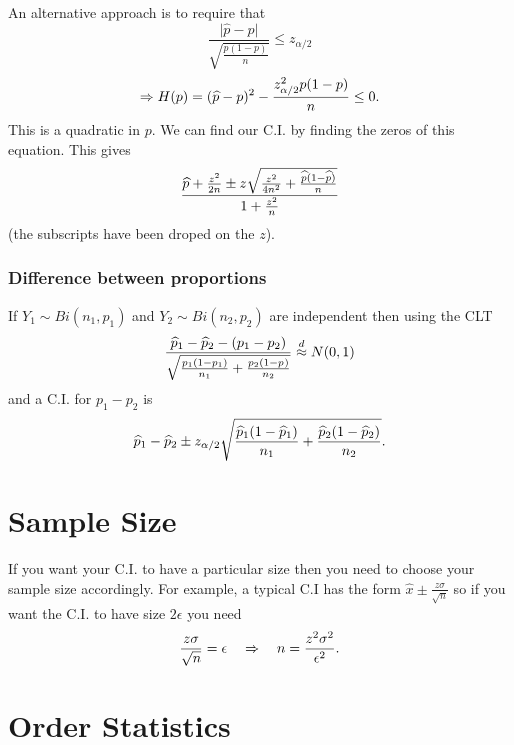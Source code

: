 \documentclass[10pt, two column]{article}
\begin{document}
An alternative approach is to require that \vspace{-6pt} 
\[ \frac{\vert \widehat{p} - p \vert}{\sqrt{\frac{p(1-p)}{n}}} \leq z_{\alpha/2} \]
\[ \Rightarrow H(p) = (\widehat{p} - p)^{2} - \frac{z_{\alpha/2}^{2} p(1-p)}{n} \leq 0. \vspace{-6pt}\]
This is a quadratic in $p$. We can find our C.I. by finding the zeros of this equation. This gives \vspace{-6pt}
\[ \frac{\widehat{p} + \frac{z^{2}}{2n} \pm z \sqrt{\frac{z^{2}}{4n^{2}} + \frac{\widehat{p}(1-\widehat{p})}{n}}}{1 + \frac{z^{2}}{n}} \vspace{-6pt}\]
(the subscripts have been droped on the $z$). 

\subsubsection{Difference between proportions} \label{diff. between props.}

If $Y_{1} \sim Bi(n_{1},p_{1})$ and $Y_{2} \sim Bi(n_{2},p_{2})$ are independent then using the CLT \vspace{-6pt}
\[ \frac{\widehat{p}_{1} - \widehat{p}_{2} - (p_{1} - p_{2})}{ \sqrt{ \frac{p_{1}(1-p_{1})}{n_{1}} + \frac{p_{2}(1-p_{})}{n_{2}} } } \stackrel{d}{\approx} N(0,1) \vspace{-6pt} \]
and a C.I. for $p_{1} - p_{2}$ is \vspace{-6pt}
\[ \widehat{p}_{1} - \widehat{p}_{2} \pm z_{\alpha/2} \sqrt{ \frac{\widehat{p}_{1} (1 - \widehat{p}_{1})}{n_{1}} + \frac{\widehat{p}_{2} (1 - \widehat{p}_{2})}{n_{2}} }. \vspace{-6pt} \]

\section{Sample Size}

If you want your C.I. to have  a particular size then you need to choose your sample size accordingly. For example, a typical C.I has the form $\widehat{x} \pm \frac{z\sigma}{\sqrt{n}}$ so if you want the C.I. to have size $2\epsilon$ you need \vspace{-6pt}
\[ \frac{z\sigma}{\sqrt{n}} = \epsilon \quad \Rightarrow \quad n = \frac{z^{2}\sigma^{2}}{\epsilon^{2}}. \vspace{-6pt} \]

\section{Order Statistics}
\end{document}
